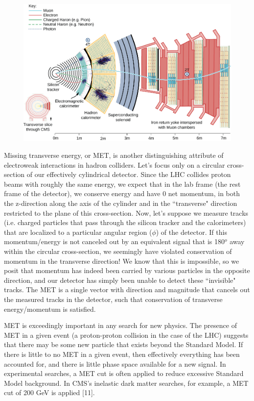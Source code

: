 \documentclass{article}
\begin{document}
\begin{figure}[H]
    \centering
    \caption{} 
    \includegraphics[width=12cm]{CMS.jpg}
    \label{fig:3}
\end{figure}
\par
Missing transverse energy, or MET, is another distinguishing attribute of electroweak interactions in hadron colliders. Let's focus only on a circular cross-section of our effectively cylindrical detector. Since the LHC collides proton beams with roughly the same energy, we expect that in the lab frame (the rest frame of the detector), we conserve energy and have 0 net momentum, in both the z-direction along the axis of the cylinder and in the ``transverse"  direction restricted to the plane of this cross-section. Now, let's suppose we measure tracks (i.e. charged particles that pass through the silicon tracker and the calorimeters) that are localized to a particular angular region ($\phi$) of the detector. If this momentum/energy is not canceled out by an equivalent signal that is 180$^{o}$ away within the circular cross-section, we seemingly have violated conservation of momentum in the transverse direction! We know that this is impossible, so we posit that momentum has indeed been carried by various particles in the opposite direction, and our detector has simply been unable to detect these ``invisible"  tracks. The MET is a single vector with direction and magnitude that cancels out the measured tracks in the detector, such that conservation of transverse energy/momentum is satisfied.
\par
MET is exceedingly important in any search for new physics. The presence of MET in a given event (a proton-proton collision in the case of the LHC) suggests that there may be some new particle that exists beyond the Standard Model. If there is little to no MET in a given event, then effectively everything has been accounted for, and there is little phase space available for a new signal. In experimental searches, a MET cut is often applied to reduce excessive Standard Model background. In CMS's inelastic dark matter searches, for example, a MET cut of 200 GeV is applied [11].
\end{document}
